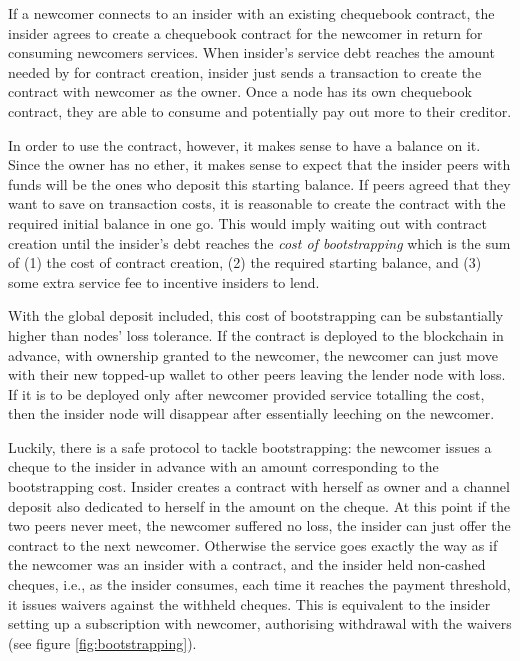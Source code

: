 \documentclass[a4paper,10pt]{article}
\begin{document}
If a newcomer connects to  an insider with an existing chequebook contract,
the insider agrees to create a chequebook contract for the newcomer
in return for consuming newcomers services.
 When insider's service debt reaches the amount needed by for contract creation,
 insider just sends a transaction to create the contract with newcomer as the owner.
Once a node has its own chequebook contract, they are able
to consume and potentially pay out more to their creditor.

In order to use the contract, however, it makes sense to have a balance on it.
Since the owner has no ether, it makes sense
to expect that the insider peers with funds will be the ones who deposit this starting balance.
If peers agreed that they want to save on transaction costs, it is reasonable to create
the contract with the required initial balance in one go. This would imply waiting out
with contract creation until the insider's debt reaches the \emph{cost of bootstrapping} which is
the sum of (1) the cost of contract creation, (2) the required starting balance, and (3) some
extra service fee to incentive insiders to lend.

With the global deposit included, this cost of bootstrapping
can be substantially higher than nodes' loss tolerance.
If the contract is deployed to the blockchain in advance, with ownership granted
to the newcomer, the newcomer can just move with their new topped-up wallet
to other peers leaving the lender node with loss.
If it is to be deployed only after newcomer provided service totalling
the cost, then the insider node will disappear after essentially leeching on
the newcomer.

Luckily, there is a safe protocol to tackle
bootstrapping: the newcomer issues a cheque to the insider in advance with an amount
corresponding to the bootstrapping cost. Insider creates a contract with herself as owner
and a channel deposit also dedicated to herself in the amount
on the cheque. At this point if the two peers never meet, the newcomer suffered no loss,
the insider can just offer the contract to the next newcomer. Otherwise the service goes
exactly the way as if the newcomer was an insider with a contract, and the insider held
non-cashed cheques, i.e., as the insider consumes, each time it reaches the
payment threshold, it issues waivers against the withheld cheques. This is equivalent
to the insider setting up a subscription with newcomer, authorising withdrawal
with the waivers (see figure \ref{fig:bootstrapping}).
\end{document}
